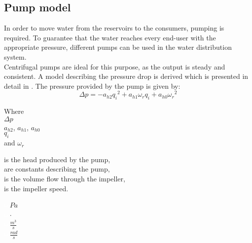 \subsection{Pump model} 
\label{PumpModel}
In order to move water from the reservoirs to the consumers, pumping is required. To guarantee that the water reaches every end-user with the appropriate pressure, different pumps can be used in the water distribution system.\\
Centrifugal pumps are ideal for this purpose, as the output is steady and consistent. 
A model describing the pressure drop is derived which is presented in detail in \cite{Phd_Carsten}. The pressure provided by the pump is given by:
\begin{equation}
  \Delta p = -a_{h2}{q_i}^2 + a_{h1} \omega_r q_i + a_{h0}{\omega_r}^2
  \label{eq:PumpModel}
\end{equation}

\begin{minipage}[t]{0.20\textwidth}
Where\\
\hspace*{8mm} $\Delta p$ \\
\hspace*{8mm} $a_{h2}$, $a_{h1}$, $a_{h0}$ \\
\hspace*{8mm} $q_i$ \\
and \hspace*{0.7mm} $\omega_r$ 

\end{minipage}
\begin{minipage}[t]{0.68\textwidth}
\vspace*{2mm}
is the head produced by the pump,\\
are constants describing the pump,\\
is the volume flow through the impeller,\\
is the impeller speed.
\end{minipage}
\begin{minipage}[t]{0.10\textwidth}
\vspace*{2mm}
\textcolor{White}{te}$\unit{Pa}$\\
\textcolor{White}{te}$\unit{\cdot}$\\
\textcolor{White}{te}$\unit{\frac{m^3}{s}}$\\
\textcolor{White}{te}$\unit{\frac{rad}{s}}$
\end{minipage}	


